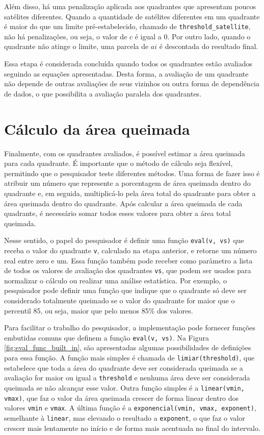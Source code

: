 \documentclass[cic,tc]{iiufrgs}
\begin{document}
Além disso, há uma penalização aplicada aos quadrantes que apresentam poucos satélites diferentes. Quando a quantidade de satélites diferentes em um quadrante é maior do que um limite pré-estabelecido, chamado de \texttt{threshold\_satellite}, não há penalizações, ou seja, o valor de $c$ é igual a 0. Por outro lado, quando o quadrante não atinge o limite, uma parcela de $ai$ é descontada do resultado final. 

Essa etapa é considerada concluída quando todos os quadrantes estão avaliados seguindo as equações apresentadas. Desta forma, a avaliação de um quadrante não depende de outras avaliações de seus vizinhos ou outra forma de dependência de dados, o que possibilita a avaliação paralela dos quadrantes.

\section{Cálculo da área queimada}
\label{sec:calculo_area_queimada}

Finalmente, com os quadrantes avaliados, é possível estimar a área queimada para cada quadrante. É importante que o método de cálculo seja flexível, permitindo que o pesquisador teste diferentes métodos. Uma forma de fazer isso é atribuir um número que represente a porcentagem de área queimada dentro do quadrante e, em seguida, multiplicá-lo pela área total do quadrante para obter a área queimada dentro do quadrante. Após calcular a área queimada de cada quadrante, é necessário somar todos esses valores para obter a área total queimada.

Nesse sentido, o papel do pesquisador é definir uma função \texttt{eval(v, vs)} que receba o valor do quadrante \texttt{v}, calculado na etapa anterior, e retorne um número real entre zero e um. Essa função também pode receber como parâmetro a lista de todos os valores de avaliação dos quadrantes \texttt{vs}, que podem ser usados para normalizar o cálculo ou realizar uma análise estatística. Por exemplo, o pesquisador pode definir uma função que indique que o quadrante só deve ser considerado totalmente queimado se o valor do quadrante for maior que o percentil 85, ou seja, maior que pelo menos 85\% dos valores.

Para facilitar o trabalho do pesquisador, a implementação pode fornecer funções embutidas comuns que definem a função \texttt{eval(v, vs)}. Na Figura \ref{fig:eval_func_built_in}, são apresentadas algumas possibilidades de definições para essa função. A função mais simples é chamada de \texttt{limiar(threshold)}, que estabelece que toda a área do quadrante deve ser considerada queimada se a avaliação for maior ou igual a \texttt{threshold} e nenhuma área deve ser considerada queimada se não alcançar esse valor. Outra função simples é a \texttt{linear(vmin, vmax)}, que faz o valor da área queimada crescer de forma linear dentro dos valores \texttt{vmin} e \texttt{vmax}. A última função é a \texttt{exponencial(vmin, vmax, exponent)}, semelhante à \texttt{linear}, mas elevando o resultado a \texttt{exponent}, o que faz o valor crescer mais lentamente no início e de forma mais acentuada no final do intervalo.
\end{document}

